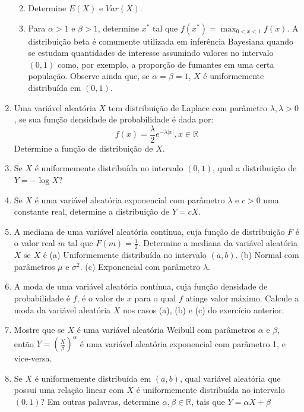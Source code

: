\documentclass[
  10pt,
]{article}
\providecommand{\tightlist}{%
  \setlength{\itemsep}{0pt}\setlength{\parskip}{0pt}}
\begin{document}
\begin{enumerate}
  \begin{enumerate}
  \def\labelenumii{(\alph{enumii})}
  \tightlist
  \item
    Determine \(E(X)\) e \(Var(X)\).
  \item
    Para \(\alpha > 1\) e \(\beta > 1\), determine \(x^*\) tal que
    \(f(x^*) = \max_{0<x<1} f(x)\). A distribuição beta é comumente
    utilizada em inferência Bayesiana quando se estudam quantidades de
    interesse assumindo valores no intervalo \((0, 1)\) como, por
    exemplo, a proporção de fumantes em uma certa população. Observe
    ainda que, se \(\alpha = \beta = 1\), \(X\) é uniformemente
    distribuída em \((0, 1)\).
  \end{enumerate}
\item
  Uma variável aleatória \(X\) tem distribuição de Laplace com parâmetro
  \(\lambda, \lambda > 0\), se sua função densidade de probabilidade é
  dada por:
  \[ f(x) = \frac{\lambda}{2}e^{-\lambda|x|}, x \in \mathbb{R} \]
  Determine a função de distribuição de \(X\).
\item
  Se \(X\) é uniformemente distribuída no intervalo \((0, 1)\), qual a
  distribuição de \(Y = -\log X\)?
\item
  Se \(X\) é uma variável aleatória exponencial com parâmetro
  \(\lambda\) e \(c > 0\) uma constante real, determine a distribuição
  de \(Y = cX\).
\item
  A mediana de uma variável aleatória contínua, cuja função de
  distribuição \(F\) é o valor real \(m\) tal que
  \(F(m) = \frac{1}{2}\). Determine a mediana da variável aleatória
  \(X\) se \(X\) é (a) Uniformemente distribuída no intervalo
  \((a, b)\). (b) Normal com parâmetros \(\mu\) e \(\sigma^2\). (c)
  Exponencial com parâmetro \(\lambda\).
\item
  A moda de uma variável aleatória contínua, cuja função densidade de
  probabilidade é \(f\), é o valor de \(x\) para o qual \(f\) atinge
  valor máximo. Calcule a moda da variável aleatória \(X\) nos casos
  (a), (b) e (c) do exercício anterior.
\item
  Mostre que se \(X\) é uma variável aleatória Weibull com parâmetros
  \(\alpha\) e \(\beta\), então \(Y = (\frac{X}{\beta})^\alpha\) é uma
  variável aleatória exponencial com parâmetro 1, e vice-versa.
\item
  Se \(X\) é uniformemente distribuída em \((a, b)\), qual variável
  aleatória que possui uma relação linear com \(X\) é uniformemente
  distribuída no intervalo \((0, 1)\)? Em outras palavras, determine
  \(\alpha, \beta \in \mathbb{R}\), tais que \(Y = \alpha X + \beta\)

\end{enumerate}
\end{document}
